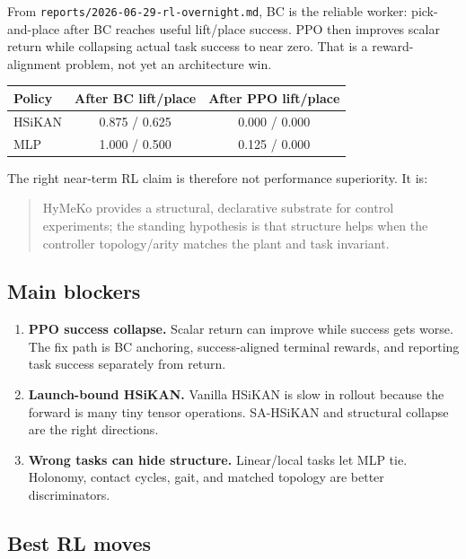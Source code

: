 \documentclass[11pt]{article}
\newcommand{\pathref}[1]{\nolinkurl{#1}}
\begin{document}
From \pathref{reports/2026-06-29-rl-overnight.md}, BC is the reliable worker:
pick-and-place after BC reaches useful lift/place success. PPO then improves
scalar return while collapsing actual task success to near zero. That is a
reward-alignment problem, not yet an architecture win.

\begin{center}\small
\begin{tabular}{lcc}
\toprule
Policy & After BC lift/place & After PPO lift/place \\
\midrule
HSiKAN & 0.875 / 0.625 & 0.000 / 0.000 \\
MLP & 1.000 / 0.500 & 0.125 / 0.000 \\
\bottomrule
\end{tabular}
\end{center}

The right near-term RL claim is therefore not performance superiority. It is:
\begin{quote}
HyMeKo provides a structural, declarative substrate for control experiments; the
standing hypothesis is that structure helps when the controller topology/arity
matches the plant and task invariant.
\end{quote}

\subsection*{Main blockers}

\begin{enumerate}[nosep]
  \item \textbf{PPO success collapse.} Scalar return can improve while success
  gets worse. The fix path is BC anchoring, success-aligned terminal rewards,
  and reporting task success separately from return.
  \item \textbf{Launch-bound HSiKAN.} Vanilla HSiKAN is slow in rollout because
  the forward is many tiny tensor operations. SA-HSiKAN and structural collapse
  are the right directions.
  \item \textbf{Wrong tasks can hide structure.} Linear/local tasks let MLP tie.
  Holonomy, contact cycles, gait, and matched topology are better discriminators.
\end{enumerate}

\subsection*{Best RL moves}
\end{document}
